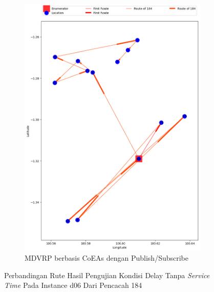 \begin{figure}[H]\ContinuedFloat
	\centering
	\begin{subfigure}[t]{\textwidth}
		\centering
		\includegraphics[width=\textwidth]{Resources/Images/delayed_6/real_m15_n100_delayed_6_184_pubsub_coes}
		\caption{MDVRP berbasis CoEAs dengan Publish/Subscribe}
		\label{fig:real_m15_n100_delayed_6_184_pubsub_coes}
	\end{subfigure}
	\caption{Perbandingan Rute Hasil Pengujian Kondisi Delay Tanpa \textit{Service Time} Pada Instance d06 Dari Pencacah 184}
	\label{fig:real_m15_n100_delayed_6_184_contd}
\end{figure}



